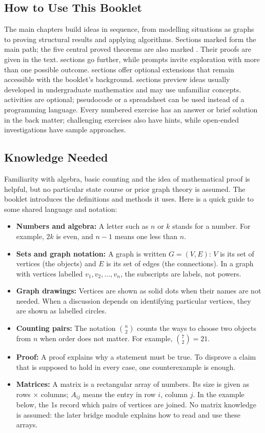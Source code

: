 \subsection*{How to Use This Booklet}
The main chapters build ideas in sequence, from modelling situations as graphs to proving structural results and applying algorithms. Sections marked \Core{} form the main path; the five central proved theorems are also marked \Core{}. Their proofs are given in the text. \Challenge{} sections go further, while \Investigation{} prompts invite exploration with more than one possible outcome. \Enrichment{} sections offer optional extensions that remain accessible with the booklet's background. \Uni{} sections preview ideas usually developed in undergraduate mathematics and may use unfamiliar concepts. \Coding{} activities are optional; pseudocode or a spreadsheet can be used instead of a programming language. Every numbered exercise has an answer or brief solution in the back matter; challenging exercises also have hints, while open-ended investigations have sample approaches.

\subsection*{Knowledge Needed}
Familiarity with algebra, basic counting and the idea of mathematical proof is helpful, but no particular state course or prior graph theory is assumed. The booklet introduces the definitions and methods it uses. Here is a quick guide to some shared language and notation:
\begin{itemize}
\item \textbf{Numbers and algebra:} A letter such as $n$ or $k$ stands for a number. For example, $2k$ is even, and $n-1$ means one less than $n$.
\item \textbf{Sets and graph notation:} A graph is written $G=(V,E)$: $V$ is its set of vertices (the objects) and $E$ is its set of edges (the connections). In a graph with vertices labelled $v_1,v_2,\ldots,v_n$, the subscripts are labels, not powers.
\item \textbf{Graph drawings:} Vertices are shown as solid dots when their names are not needed. When a discussion depends on identifying particular vertices, they are shown as labelled circles.
\item \textbf{Counting pairs:} The notation $\binom{n}{2}$ counts the ways to choose two objects from $n$ when order does not matter. For example, $\binom{7}{2}=21$.
\item \textbf{Proof:} A proof explains why a statement must be true. To disprove a claim that is supposed to hold in every case, one counterexample is enough.
\item \textbf{Matrices:} A matrix is a rectangular array of numbers. Its size is given as rows $\times$ columns; $A_{ij}$ means the entry in row $i$, column $j$. In the example below, the 1s record which pairs of vertices are joined. No matrix knowledge is assumed: the later bridge module explains how to read and use these arrays.
\end{itemize}

